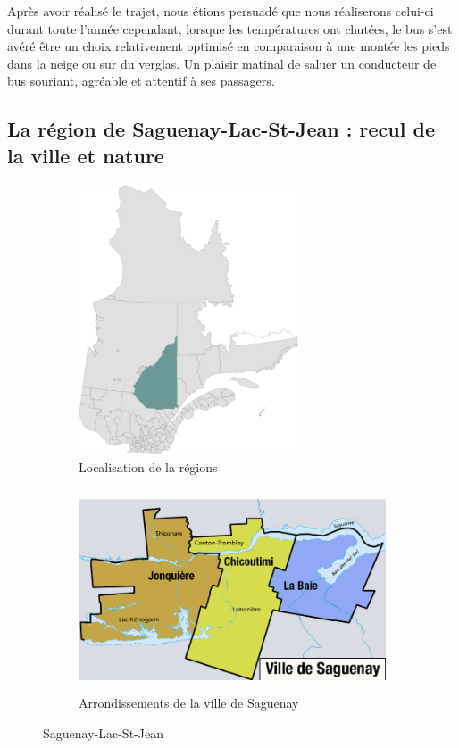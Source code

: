 Après avoir réalisé le trajet, nous étions persuadé que nous réaliserons celui-ci durant toute l'année cependant, lorsque les températures ont chutées, le bus s'est avéré être un choix relativement optimisé en comparaison à une montée les pieds dans la neige ou sur du verglas. Un plaisir matinal de saluer un conducteur de bus souriant, agréable et attentif à ses passagers.


\subsection{La région de Saguenay-Lac-St-Jean : recul de la ville et nature}
\begin{figure}[h]

\begin{subfigure}{0.5\textwidth}
\includegraphics[width=0.9\linewidth, height=8cm]
{images/environnement_etudes/Saguenay.png} 
\caption{Localisation de la régions}
\label{fig:subim1}
\end{subfigure}
\begin{subfigure}{0.5\textwidth}
\includegraphics[width=0.9\linewidth, height=6cm]
{images/environnement_etudes/Arrondissements_de_Saguenay.png}
\caption{Arrondissements de la ville de Saguenay}
\label{fig:subim2}
\end{subfigure}

\caption{Saguenay-Lac-St-Jean}
\label{fig:image2}
\end{figure}

